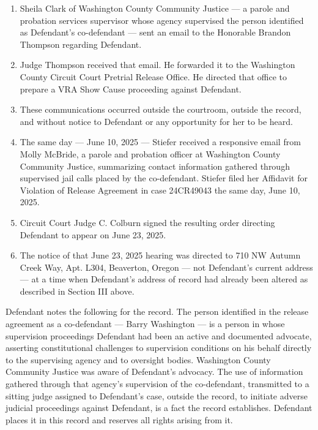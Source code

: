 \documentclass[12pt,letterpaper]{article}
\begin{document}
\begin{enumerate}[leftmargin=*, label=\arabic*., itemsep=4pt]

\item Sheila Clark of Washington County Community Justice --- a parole and
probation services supervisor whose agency supervised the person identified as
Defendant's co-defendant --- sent an email to the Honorable Brandon Thompson
regarding Defendant.

\item Judge Thompson received that email. He forwarded it to the Washington County
Circuit Court Pretrial Release Office. He directed that office to prepare a VRA
Show Cause proceeding against Defendant.

\item These communications occurred outside the courtroom, outside the record, and
without notice to Defendant or any opportunity for her to be heard.

\item The same day --- June 10, 2025 --- Stiefer received a responsive email from
Molly McBride, a parole and probation officer at Washington County Community
Justice, summarizing contact information gathered through supervised jail calls
placed by the co-defendant. Stiefer filed her Affidavit for Violation of Release
Agreement in case 24CR49043 the same day, June 10, 2025.

\item Circuit Court Judge C. Colburn signed the resulting order directing
Defendant to appear on June 23, 2025.

\item The notice of that June 23, 2025 hearing was directed to 710 NW Autumn
Creek Way, Apt. L304, Beaverton, Oregon --- not Defendant's current address ---
at a time when Defendant's address of record had already been altered as described
in Section III above.

\end{enumerate}

Defendant notes the following for the record. The person identified in the release
agreement as a co-defendant --- Barry Washington --- is a person in whose
supervision proceedings Defendant had been an active and documented advocate,
asserting constitutional challenges to supervision conditions on his behalf
directly to the supervising agency and to oversight bodies. Washington County
Community Justice was aware of Defendant's advocacy. The use of information
gathered through that agency's supervision of the co-defendant, transmitted to
a sitting judge assigned to Defendant's case, outside the record, to initiate
adverse judicial proceedings against Defendant, is a fact the record establishes.
Defendant places it in this record and reserves all rights arising from it.
\end{document}
